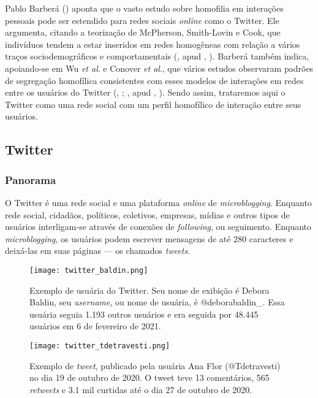 \documentclass[
	12pt,				%
	openright,			%
	twoside,			%
	a4paper,			%
	english,			%
	brazil				%
	]{abntex2}
\begin{document}
 Pablo Barberá (\citeyear{barbera2015}) aponta que o vasto estudo sobre homofilia em interações pessoais pode ser estendido para redes sociais \textit{online} como o Twitter. Ele argumenta, citando a teorização de McPherson, Smith-Lovin e Cook, que indivíduos tendem a estar inseridos em redes homogêneas com relação a vários traços sociodemográficos e comportamentais (, \citeyear{mcpherson2001} apud , \citeyear{barbera2015}). Barberá também indica, apoiando-se em Wu \emph{et al}. e Conover \emph{et al}., que vários estudos observaram padrões de segregação homofílica consistentes com esses modelos de interações em redes entre os usuários do Twitter (, \citeyear{wu2011}; , \citeyear{conover2012} apud , \citeyear{barbera2015}). Sendo assim, trataremos aqui o Twitter como uma rede social com um perfil homofílico de interação entre seus usuários.

\subsection{Twitter}

\subsubsection{Panorama}
 O Twitter é uma rede social e uma plataforma \textit{online} de \emph{microblogging}. Enquanto rede social, cidadãos, políticos, coletivos, empresas, mídias e outros tipos de usuários interligam-se através de conexões de \emph{following}, ou seguimento. Enquanto \emph{microblogging}, os usuários podem escrever mensagens de até 280 caracteres e deixá-las em suas páginas --- os chamados \emph{tweets}.

 \begin{figure}[!htbp]
    \centering
    \texttt{[image: twitter\_baldin.png]}
    \caption{Exemplo de usuária do Twitter. Seu nome de exibição é Debora Baldin, seu \emph{username}, ou nome de usuária, é @deborabaldin\_. Essa usuária seguia 1.193 outros usuários e era seguida por 48.445 usuários em 6 de fevereiro de 2021.}
    \label{fig:baldin}
\end{figure}

 \begin{figure}[!htbp]
    \centering
    \texttt{[image: twitter\_tdetravesti.png]}
    \caption{Exemplo de \emph{tweet}, publicado pela usuária Ana Flor (@Tdetravesti) no dia 19 de outubro de 2020. O tweet teve 13 comentários, 565 \emph{retweets} e 3.1 mil curtidas até o dia 27 de outubro de 2020.}
    \label{fig:tdetravesti}
\end{figure}
\end{document}
